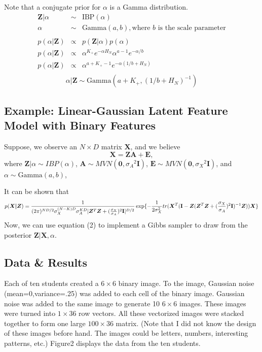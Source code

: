 \noindent
Note that a conjugate prior for $\alpha$ is a Gamma distribution.
\[
  \begin{array}{rcl}
    \bm Z|\alpha & \sim & \text{IBP}(\alpha)\\
          \alpha & \sim & \text{Gamma}(a,b), \text{where $b$ is the scale parameter}\\
    & & \\
    p(\alpha|\bm Z) & \propto & p(\bm Z|\alpha) p(\alpha)\\
    p(\alpha|\bm Z) & \propto & \alpha^{K_+} e^{-\alpha H_N}  
                                \alpha^{a-1} e^{-\alpha/b}\\
    p(\alpha|\bm Z) & \propto & \alpha^{a+K_+-1} e^{-\alpha(1/b+H_N)}\\
  \end{array}
\]
\begin{equation}
  \alpha|\bm Z  \sim  \text{Gamma}(a+K_+, (1/b+H_N)^{-1})
\end{equation}

\subsection{Example: Linear-Gaussian Latent Feature Model with Binary Features}
Suppose, we observe an $N \times D$ matrix $\bm X$, and we believe
\[
  \bm X = \bm{ZA} + \bm E,
\]
where $\bm Z|\alpha \sim IBP(\alpha)$, 
$\bm A \sim MVN(\bm 0,{\sigma_A}^2\textbf{I})$, 
$\bm E \sim MVN(\bm 0,{\sigma_X}^2\textbf{I})$, and
$\alpha \sim \text{Gamma}(a,b)$,

\noindent
It can be shown that
\begin{equation}  
  p(\bm{X|Z}) = \displaystyle\frac{1}{(2\pi)^{ND/2}\sigma_X^{(N-K)D}\sigma_A^{KD}
                            |\bm Z^T \bm Z+({\frac{\sigma_X}{\sigma_A}})^2
                            \textbf{I}|^{D/2}}
                \exp\{-\frac{1}{2\sigma_X^2}tr(\bm X^T
                (\textbf{I}-\bm Z(\bm Z^T\bm Z+({\frac{\sigma_X}{\sigma_A}})^2
                            \textbf{I})^{-1}\bm Z))
                \bm X\}            
\end{equation}
Now, we can use equation (2) to implement a Gibbs sampler to draw from the 
posterior $\bm{Z|X},\alpha$.

\subsection{Data \& Results}
Each of ten students created a $6 \times 6$ binary image. To the
image, Gaussian noise (mean=0,variance=.25) was added to each cell of the
binary image. Gaussian noise was added to the same image to generate 10 $6
\times 6$ images. These images were turned into $1 \times 36$ row vectors. All
these vectorized images were stacked together to form one large $100 \times 36$
matrix.  (Note that I did not know the design of these images before hand. The
images could be letters, numbers, interesting patterns, etc.)
Figure2 displays the data from the ten students.\\

